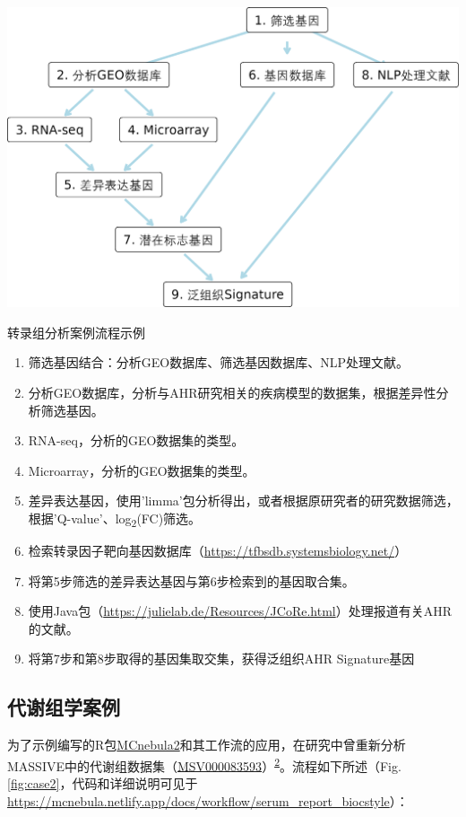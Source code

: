 \documentclass[
]{article}
\providecommand{\tightlist}{%
  \setlength{\itemsep}{0pt}\setlength{\parskip}{0pt}}
\begin{document}
\bgroup {}
\includegraphics[width=24in]{thesis_fig/analysis_case} \caption{转录组分析案例流程示例}\label{fig:case1}
\makeatletter \egroup

\begin{enumerate}
\def\labelenumi{\arabic{enumi}.}
\tightlist
\item
  筛选基因结合：分析GEO数据库、筛选基因数据库、NLP处理文献。
\item
  分析GEO数据库，分析与AHR研究相关的疾病模型的数据集，根据差异性分析筛选基因。
\item
  RNA-seq，分析的GEO数据集的类型。
\item
  Microarray，分析的GEO数据集的类型。
\item
  差异表达基因，使用'limma'包分析得出，或者根据原研究者的研究数据筛选，根据'Q-value'、log\textsubscript{2}(FC)筛选。
\item
  检索转录因子靶向基因数据库（\url{https://tfbsdb.systemsbiology.net/}）
\item
  将第5步筛选的差异表达基因与第6步检索到的基因取合集。
\item
  使用Java包（\url{https://julielab.de/Resources/JCoRe.html}）处理报道有关AHR的文献。
\item
  将第7步和第8步取得的基因集取交集，获得泛组织AHR Signature基因
\end{enumerate}

\hypertarget{ux4ee3ux8c22ux7ec4ux5b66ux6848ux4f8b}{%
\subsection{代谢组学案例}\label{ux4ee3ux8c22ux7ec4ux5b66ux6848ux4f8b}}

为了示例编写的R包\href{https://github.com/Cao-lab-zcmu/MCnebula2}{MCnebula2}和其工作流的应用，在研究中曾重新分析MASSIVE中的代谢组数据集（\href{https://massive.ucsd.edu/ProteoSAFe/QueryMSV?id=MSV000083593}{MSV000083593}）\textsuperscript{\protect\hyperlink{ref-2020s}{2}}。流程如下所述（Fig. \ref{fig:case2}，代码和详细说明可见于\url{https://mcnebula.netlify.app/docs/workflow/serum_report_biocstyle}）：
\end{document}
